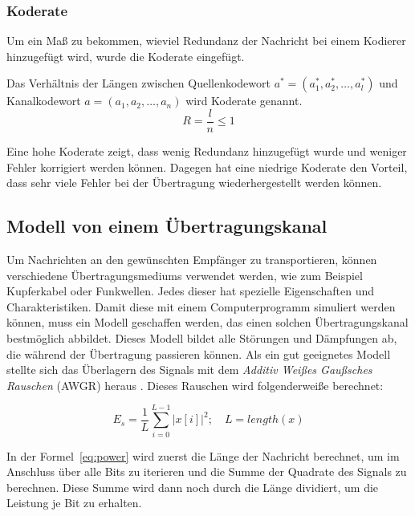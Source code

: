 \subsubsection{Koderate}
\label{sec:codeRate}
Um ein Maß zu bekommen, wieviel Redundanz der Nachricht bei einem Kodierer hinzugefügt wird, wurde die Koderate eingefügt.

\begin{t_def}
Das Verhältnis der Längen zwischen Quellenkodewort $a^*=(a^*_1,a^*_2,\dotsc,a^*_l)$ und Kanalkodewort $a=(a_1,a_2,\dotsc,a_n)$ wird Koderate genannt.
\begin{equation}
R = \frac{l}{n} \leq 1
\end{equation} 
\end{t_def} 

Eine hohe Koderate zeigt, dass wenig Redundanz hinzugefügt wurde und weniger Fehler korrigiert werden können. Dagegen hat eine niedrige Koderate den Vorteil, dass sehr viele Fehler bei der Übertragung wiederhergestellt werden können. \cite[136]{schoenfeld2012informations} 

\subsection{Modell von einem Übertragungskanal}
\label{sec:channels}
Um Nachrichten an den gewünschten Empfänger zu transportieren, können verschiedene Übertragungsmediums verwendet werden, wie zum Beispiel Kupferkabel oder Funkwellen. Jedes dieser hat spezielle Eigenschaften und Charakteristiken. Damit diese mit einem Computerprogramm simuliert werden können, muss ein Modell geschaffen werden, das einen solchen Übertragungskanal bestmöglich abbildet. Dieses Modell bildet alle Störungen und Dämpfungen ab, die während der Übertragung passieren können. Als ein gut geeignetes Modell stellte sich das Überlagern des Signals mit dem \emph{Additiv Weißes Gaußsches Rauschen} (AWGR) heraus \cite[81]{schoenfeld2012informations}. Dieses Rauschen wird folgenderweiße berechnet:

\begin{equation}
E_s = \frac{1}{L} \displaystyle\sum_{i=0}^{L-1} |x[i]|^2; \quad L = length(x)
\label{eq:power}
\end{equation}

In der Formel~\ref{eq:power} wird zuerst die Länge der Nachricht berechnet, um im Anschluss über alle Bits zu iterieren und die Summe der Quadrate des Signals zu berechnen. Diese Summe wird dann noch durch die Länge dividiert, um die Leistung je Bit zu erhalten.

